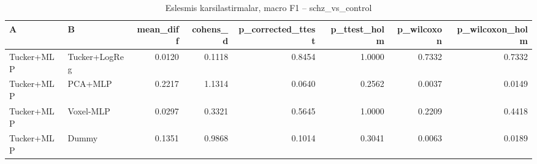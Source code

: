 \begin{table}[htbp]
  \centering
  \caption{Eslesmis karsilastirmalar, macro F1 -- schz\_vs\_control}
  \label{tab:tests_schz_vs_control}
  \small
  \begin{tabular}{llrrrrrr}
    \toprule
    A & B & mean\_diff & cohens\_d & p\_corrected\_ttest & p\_ttest\_holm & p\_wilcoxon & p\_wilcoxon\_holm \\
    \midrule
    Tucker+MLP & Tucker+LogReg & 0.0120 & 0.1118 & 0.8454 & 1.0000 & 0.7332 & 0.7332 \\
    Tucker+MLP & PCA+MLP & 0.2217 & 1.1314 & 0.0640 & 0.2562 & 0.0037 & 0.0149 \\
    Tucker+MLP & Voxel-MLP & 0.0297 & 0.3321 & 0.5645 & 1.0000 & 0.2209 & 0.4418 \\
    Tucker+MLP & Dummy & 0.1351 & 0.9868 & 0.1014 & 0.3041 & 0.0063 & 0.0189 \\
    \bottomrule
  \end{tabular}
\end{table}
